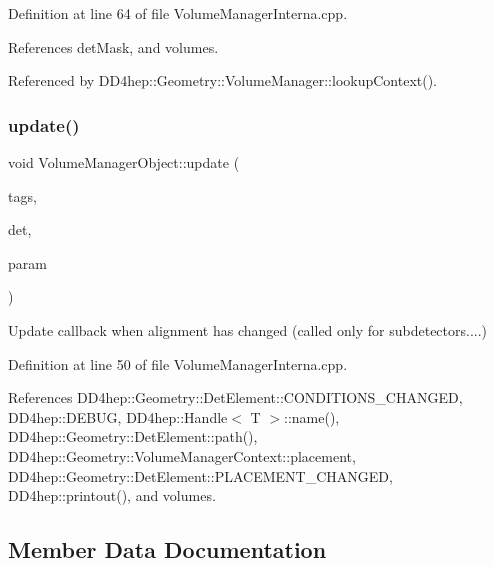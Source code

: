 Definition at line 64 of file Volume\+Manager\+Interna.\+cpp.



References det\+Mask, and volumes.



Referenced by D\+D4hep\+::\+Geometry\+::\+Volume\+Manager\+::lookup\+Context().

\hypertarget{class_d_d4hep_1_1_geometry_1_1_volume_manager_object_a61234dfd7ac8a594ec2c9a0dcb6a274d}{}\label{class_d_d4hep_1_1_geometry_1_1_volume_manager_object_a61234dfd7ac8a594ec2c9a0dcb6a274d} 
\subsubsection{\texorpdfstring{update()}{update()}}
{\footnotesize\ttfamily void Volume\+Manager\+Object\+::update (\begin{DoxyParamCaption}\item[{unsigned long}]{tags,  }\item[{\hyperlink{class_d_d4hep_1_1_geometry_1_1_det_element}{Det\+Element} \&}]{det,  }\item[{void $\ast$}]{param }\end{DoxyParamCaption})}



Update callback when alignment has changed (called only for subdetectors....) 



Definition at line 50 of file Volume\+Manager\+Interna.\+cpp.



References D\+D4hep\+::\+Geometry\+::\+Det\+Element\+::\+C\+O\+N\+D\+I\+T\+I\+O\+N\+S\+\_\+\+C\+H\+A\+N\+G\+ED, D\+D4hep\+::\+D\+E\+B\+UG, D\+D4hep\+::\+Handle$<$ T $>$\+::name(), D\+D4hep\+::\+Geometry\+::\+Det\+Element\+::path(), D\+D4hep\+::\+Geometry\+::\+Volume\+Manager\+Context\+::placement, D\+D4hep\+::\+Geometry\+::\+Det\+Element\+::\+P\+L\+A\+C\+E\+M\+E\+N\+T\+\_\+\+C\+H\+A\+N\+G\+ED, D\+D4hep\+::printout(), and volumes.



\subsection{Member Data Documentation}
\hypertarget{class_d_d4hep_1_1_geometry_1_1_volume_manager_object_a998bff824dead1dfec1642f57eae9117}{}\label{class_d_d4hep_1_1_geometry_1_1_volume_manager_object_a998bff824dead1dfec1642f57eae9117} 

